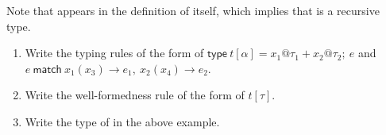 \begin{enumerate}
Note that  appears in the definition of itself, which implies that
 is a recursive type.

\begin{enumerate}
\item
  Write the typing rules of the form
     of
    $\textsf{type}\ t[\alpha]=x_1@\tau_1+x_2@\tau_2;\ e$ and
    $e\ \textsf{match}\ x_1(x_3)\rightarrow e_1,\ x_2(x_4)\rightarrow e_2$.
\item
  Write the well-formedness rule of the form
    \fbox{$\Gamma\vdash\tau$} of $t[\tau]$.
\item
  Write the type of  in the above example.
\end{enumerate}

\end{enumerate}
